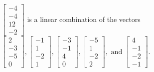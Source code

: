 \begin{exercise}
\begin{exerciseStatement}
  \end{exerciseStatement}
  \begin{exerciseAnswer}
   \(\left[\begin{array}{c}
-4 \\
-4 \\
12 \\
-2
\end{array}\right]\) 
  	 is  
	a linear combination of the vectors \(\left[\begin{array}{c}
2 \\
-3 \\
-5 \\
0
\end{array}\right] , \left[\begin{array}{c}
-1 \\
1 \\
-2 \\
1
\end{array}\right] , \left[\begin{array}{c}
-3 \\
-1 \\
4 \\
0
\end{array}\right] , \left[\begin{array}{c}
-5 \\
1 \\
-2 \\
2
\end{array}\right] , \text{ and } \left[\begin{array}{c}
4 \\
-1 \\
-2 \\
-1
\end{array}\right]\).

	
  


  \end{exerciseAnswer}
\end{exercise}